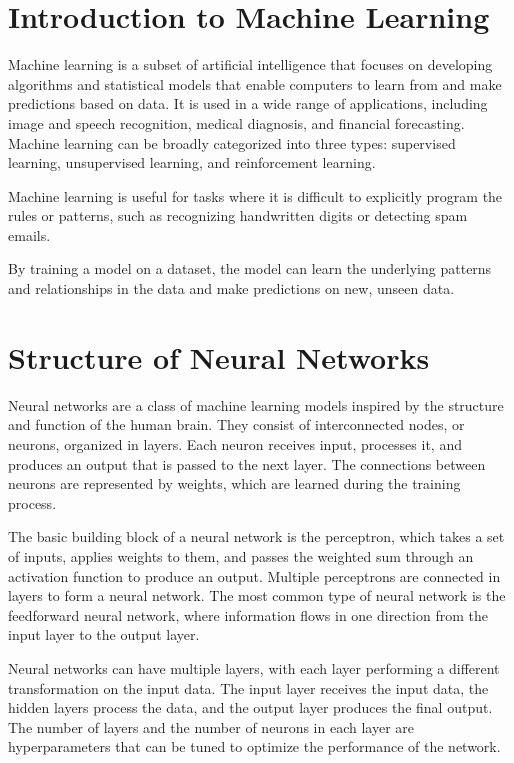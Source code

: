 \documentclass{report}
\begin{document}
    \section{Introduction to Machine Learning}
        Machine learning is a subset of artificial intelligence that focuses on developing algorithms and statistical models that enable computers to learn from and make predictions based on data. 
        It is used in a wide range of applications, including image and speech recognition, medical diagnosis, and financial forecasting. 
        Machine learning can be broadly categorized into three types: supervised learning, unsupervised learning, and reinforcement learning.

        Machine learning is useful for tasks where it is difficult to explicitly program the rules or patterns, such as recognizing handwritten digits or detecting spam emails.
        
        By training a model on a dataset, the model can learn the underlying patterns and relationships in the data and make predictions on new, unseen data.

    \section{Structure of Neural Networks}
        Neural networks are a class of machine learning models inspired by the structure and function of the human brain. They consist of interconnected nodes, or neurons, organized in layers. Each neuron receives input, processes it, and produces an output that is passed to the next layer. The connections between neurons are represented by weights, which are learned during the training process.

        \vspace{1em} \noindent The basic building block of a neural network is the perceptron, which takes a set of inputs, applies weights to them, and passes the weighted sum through an activation function to produce an output. Multiple perceptrons are connected in layers to form a neural network. The most common type of neural network is the feedforward neural network, where information flows in one direction from the input layer to the output layer.

        \vspace{1em} \noindent Neural networks can have multiple layers, with each layer performing a different transformation on the input data. The input layer receives the input data, the hidden layers process the data, and the output layer produces the final output. The number of layers and the number of neurons in each layer are hyperparameters that can be tuned to optimize the performance of the network.
\end{document}
